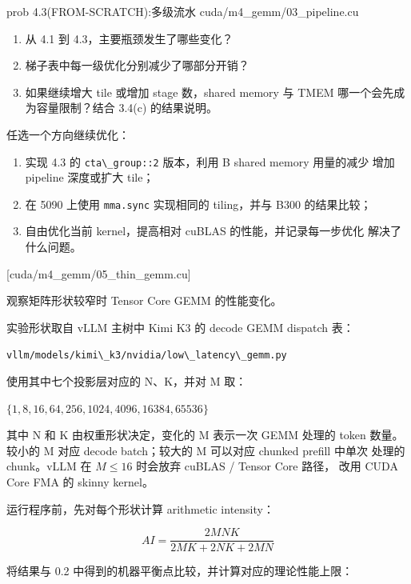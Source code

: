 \documentclass[11pt,a4paper,fontset=none]{ctexart}
\providecommand{\passthrough}[1]{#1}
\begin{document}
\begin{capstone}{prob 4.3(FROM-SCRATCH):多级流水 \hfill {\footnotesize\ttfamily cuda/m4\_gemm/03\_pipeline.cu}}
\begin{enumerate}
  \begin{enumerate}
  \def\labelenumii{(\alph{enumii})}
  \item
    从 4.1 到 4.3，主要瓶颈发生了哪些变化？
  \item
    梯子表中每一级优化分别减少了哪部分开销？
  \item
    如果继续增大 tile 或增加 stage 数，shared memory 与 TMEM
    哪一个会先成为容量限制？结合 3.4(c) 的结果说明。
  \end{enumerate}
\end{enumerate}

\end{capstone}


任选一个方向继续优化：

\begin{enumerate}
\def\labelenumi{(\alph{enumi})}
\item
  实现 4.3 的 \passthrough{\lstinline!cta\_group::2!} 版本，利用 B
  shared memory 用量的减少 增加 pipeline 深度或扩大 tile；
\item
  在 5090 上使用 \passthrough{\lstinline!mma.sync!} 实现相同的
  tiling，并与 B300 的结果比较；
\item
  自由优化当前 kernel，提高相对 cuBLAS 的性能，并记录每一步优化
  解决了什么问题。
\end{enumerate}

[cuda/m4\_gemm/05\_thin\_gemm.cu]

观察矩阵形状较窄时 Tensor Core GEMM 的性能变化。

实验形状取自 vLLM 主树中 Kimi K3 的 decode GEMM dispatch 表：

\passthrough{\lstinline!vllm/models/kimi\_k3/nvidia/low\_latency\_gemm.py!}

使用其中七个投影层对应的 N、K，并对 M 取：

\(\{1, 8, 16, 64, 256, 1024, 4096, 16384, 65536\}\)

其中 N 和 K 由权重形状决定，变化的 M 表示一次 GEMM 处理的 token 数量。
较小的 M 对应 decode batch；较大的 M 可以对应 chunked prefill 中单次
处理的 chunk。vLLM 在 \(M \le 16\) 时会放弃 cuBLAS / Tensor Core 路径，
改用 CUDA Core FMA 的 skinny kernel。

运行程序前，先对每个形状计算 arithmetic intensity：

\[
AI = \frac{2MNK}{2MK + 2NK + 2MN}
\]

将结果与 0.2 中得到的机器平衡点比较，并计算对应的理论性能上限：
\end{document}
